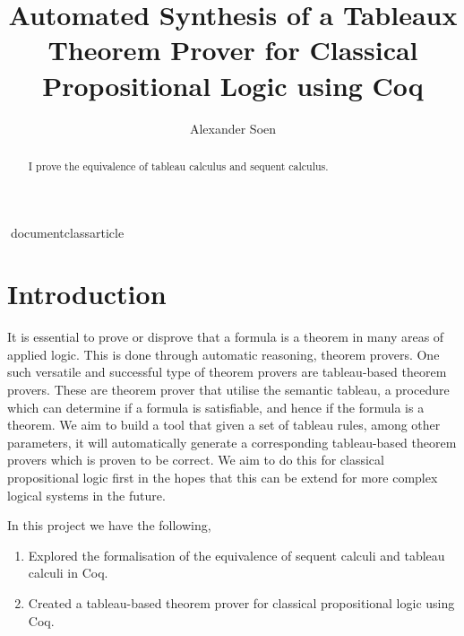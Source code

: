 documentclass{article}

\usepackage{amsmath}
\usepackage{amsthm}
\usepackage{amsfonts}
\usepackage{amssymb}
\usepackage{mathtools}
\usepackage{listings}
\usepackage[margin=1in]{geometry}
\usepackage{multicol}
\usepackage[english]{babel}
\usepackage[utf8]{inputenc}

\setlength{\parindent}{0pt}
\setlength{\parskip}{\baselineskip}

\newtheorem{definition}{Definition}
\newcommand{\eref}[1]{Equation \ref{#1}}

\lstset{
inputencoding=latin1
}

\title{Automated Synthesis of a Tableaux Theorem Prover for Classical
Propositional Logic using Coq}
\author{Alexander Soen}



\begin{abstract}
I prove the equivalence of tableau calculus and sequent calculus.
\end{abstract}

\section{Introduction}

It is essential to prove or disprove that a formula is a theorem in many areas
of applied logic. This is done through automatic reasoning, theorem provers.
One such versatile and successful type of theorem provers are tableau-based
theorem provers. These are theorem prover that utilise the semantic tableau, a
procedure which can determine if a formula is satisfiable, and hence if the
formula is a theorem. We aim to build a tool that given a set of tableau rules,
among other parameters, it will automatically generate a corresponding
tableau-based theorem provers which is proven to be correct. We aim to do this
for classical propositional logic first in the hopes that this can be extend
for more complex logical systems in the future.

In this project we have the following,

\begin{enumerate}
\item Explored the formalisation of the equivalence of sequent calculi and 
tableau calculi in Coq.
\item Created a tableau-based theorem prover for classical
propositional logic using Coq.
\end{enumerate}

